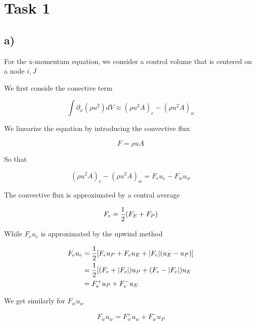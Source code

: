 \documentclass{article}
\begin{document}

\section{Task 1}

\subsection{a)}

For the x-momentum equation, we consider a control volume that is centered on a node $i,J$

We first conside the conective term

\begin{equation}
\int\partial_x (\rho u^2) dV \approx (\rho u^2 A)_e - (\rho u^2 A)_w
\end{equation}

We linearize the equation by introducing the convective flux

\begin{equation}
F = \rho u A
\end{equation}

So that 

\begin{equation}
(\rho u^2 A)_e - (\rho u^2 A)_w = F_e u_e - F_w u_w
\end{equation}

The convective flux is approximated by a central average

\begin{equation}
F_e  = \frac{1}{2} (F_E + F_P)
\end{equation}

While $F_e u_e$ is approximated by the upwind method

\begin{align}
F_e u_e &= \frac{1}{2} [F_e u_P + F_e u_E  + |F_e| (u_E - u_P) ]\\
	&= \frac{1}{2} [(F_e + |F_e|)u_P + (F_e - |F_e|)u_E \\
	&= F_e^+ u_P + F_e^- u_E
\end{align}

We get similarly for $F_wu_w$

\begin{equation}
	F_wu_w = F_w^+ u_w + F_w^- u_P
\end{equation}
\end{document}
